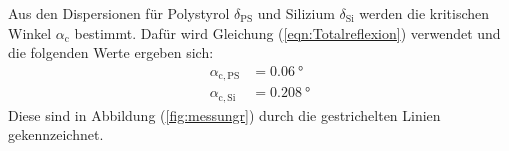 Aus den  Dispersionen für Polystyrol $\delta_\mathrm{PS}$ und Silizium $\delta_\mathrm{Si}$ werden die kritischen Winkel $\alpha_\mathrm{c}$ bestimmt. Dafür wird Gleichung (\ref{eqn:Totalreflexion}) verwendet und die folgenden Werte ergeben sich:
\begin{align*}
  \alpha_\mathrm{c,PS} &=\SI{0.06}{\degree} \\
  \alpha_\mathrm{c,Si} &=\SI{0.208}{\degree}
\end{align*}
Diese sind in Abbildung (\ref{fig:messungr}) durch die gestrichelten Linien gekennzeichnet.
